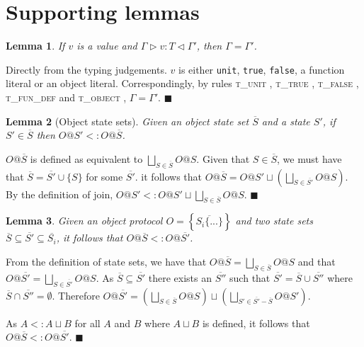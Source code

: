 \documentclass[preprint]{sigplanconf}
\newtheorem{lem}{Lemma}
\newcommand{\tunit}{\textsc{t\_unit} }
\newcommand{\ttrue}{\textsc{t\_true} }
\newcommand{\tfalse}{\textsc{t\_false} }
\newcommand{\tobj}{\textsc{t\_object} }
\newcommand{\tfundef}{\textsc{t\_fun\_def} }
\newcommand{\typerule}[4]{#1 \triangleright #2 : #3 \triangleleft #4}
\newcommand{\qed}{$\blacksquare$}
\newenvironment{proof}{\vspace{1ex}\noindent{\bf Proof}\hspace{0.5em}}
  {\hfill\qed\vspace{1ex}}
\begin{document}
\section{Supporting lemmas}
\label{app:proofs}


\begin{lem}
\label{lem:valuectx}
If $v$ is a value and $\typerule{\Gamma}{v}{T}{\Gamma'}$, then $\Gamma = \Gamma'$.
\end{lem}
\begin{proof}
Directly from the typing judgements. $v$ is either {\tt unit}, {\tt true},
{\tt false}, a function literal or an object literal.
Correspondingly, by rules \tunit,
\ttrue, \tfalse, 
\tfundef and \tobj, $\Gamma = \Gamma'$.
\end{proof}

\begin{lem}[Object state sets]
Given an object state set $\overline{S}$ and a state $S'$, if
$S' \in \overline{S}$ then $O@S' <: O@\overline{S}$.
\end{lem}
\begin{proof}
$O@\overline{S}$ is defined as equivalent to
$\bigsqcup_{S \in \overline{S}}{O@S}$. Given that $S \in \overline{S}$,
we must have that $\overline{S} = \overline{S'} \cup \{ S \}$ for
some $\overline{S'}$.
it follows that $O@\overline{S} = O@S' \sqcup \left( 
\bigsqcup_{S \in \overline{S'}}{O@S} \right)$.
By the definition of join, 
$O@S' <: O@S' \sqcup \bigsqcup_{S \in \overline{S}}{O@S}$.
\end{proof}


\begin{lem}
\label{lem:ssetinc}
Given an object protocol $O = \left\{ \overline{ S_i \{ ... \} } \right\}$ and two state sets 
$\overline{S} \subseteq \overline{S'} \subseteq \overline{S_i}$, it follows
that $O@\overline{S} <: O@\overline{S'}$.
\end{lem}
\begin{proof}
From the definition of state sets, we have that 
$O@\overline{S} = \bigsqcup_{S \in \overline{S}}{O@S}$ and that
$O@\overline{S'} = \bigsqcup_{S \in \overline{S'}}{O@S}$.
As $\overline{S} \subseteq \overline{S'}$ there exists an
$\overline{S''}$ such that $\overline{S'} = \overline{S} \cup \overline{S''}$
where $\overline{S} \cap \overline{S''} = \emptyset$. Therefore
$O@\overline{S'} = \left(\bigsqcup_{S \in \overline{S}}{O@S}\right) \sqcup \left(\bigsqcup_{S' \in \overline{S'} - \overline{S}}{O@S'}\right)$.

As $A <: A \sqcup B$ for all $A$ and $B$ where $A \sqcup B$ is defined, 
it follows that $O@\overline{S} <: O@\overline{S'}$.
\end{proof}
\end{document}
